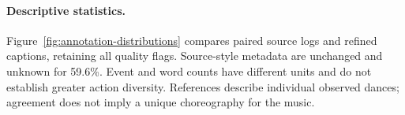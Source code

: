 \paragraph{Descriptive statistics.}
Figure~\ref{fig:annotation-distributions} compares paired source logs
and refined captions, retaining all quality flags. Source-style metadata
are unchanged and unknown for 59.6\%. Event and word counts have
different units and do not establish greater action diversity.
References describe individual observed dances; agreement does not
imply a unique choreography for the music.
